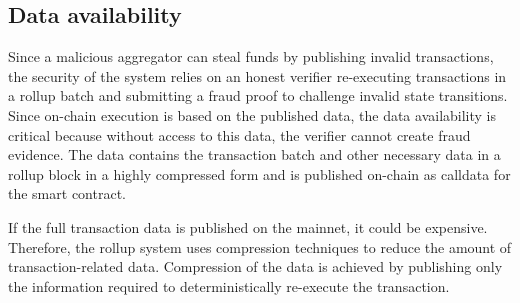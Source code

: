 \documentclass{article}
\begin{document}
\subsection{Data availability}
Since a malicious aggregator can steal funds by publishing invalid transactions, the security of the system relies on an honest verifier re-executing transactions in a rollup batch and submitting a fraud proof to challenge invalid state transitions. Since on-chain execution is based on the published data, the data availability is critical because without access to this data, the verifier cannot create fraud evidence. The data contains the transaction batch and other necessary data in a rollup block in a highly compressed form and is published on-chain as calldata for the smart contract.

If the full transaction data is published on the mainnet, it could be expensive. Therefore, the rollup system uses compression techniques to reduce the amount of transaction-related data. Compression of the data is achieved by publishing only the information required to deterministically re-execute the transaction.


\end{document}
